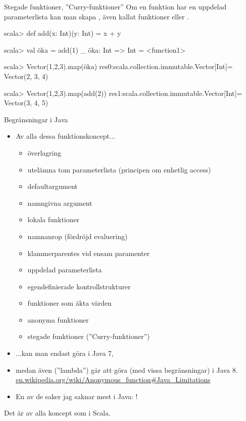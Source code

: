 \begin{Slide}{Stegade funktioner, ''Curry-funktioner''}
Om en funktion har en uppdelad parameterlista kan man skapa , även kallat  funktioner  eller .
\begin{REPLnonum}
scala> def add(x: Int)(y: Int) = x + y  

scala> val öka = add(1) _
öka: Int => Int = <function1>

scala> Vector(1,2,3).map(öka)
res0:scala.collection.immutable.Vector[Int]= Vector(2, 3, 4)

scala> Vector(1,2,3).map(add(2))
res1:scala.collection.immutable.Vector[Int]= Vector(3, 4, 5)
\end{REPLnonum}
\end{Slide} 


\begin{Slide}{Begränsningar i Java}\SlideFontTiny
\begin{itemize}
\item Av alla dessa funktionskoncept...
\begin{itemize}\SlideFontTiny
\item överlagring
\item utelämna tom parameterlista (principen om enhetlig access)
\item defaultargument
\item namngivna argument
\item lokala funktioner
\item namnanrop (fördröjd evaluering)
\item klammerparentes vid ensam paramenter
\item uppdelad parameterlista
\item egendefinierade kontrollstrukturer
\item funktioner som äkta värden
\item anonyma funktioner
\item stegade funktioner (''Curry-funktioner'')
\end{itemize}
\item ...kan man endast göra  i Java 7, 
\item medan även  (''lambda'') går att göra (med vissa begränsningar) i Java 8. \href{https://en.wikipedia.org/wiki/Anonymous_function\#Java_Limitations}{en.wikipedia.org/wiki/Anonymous\_function\#Java\_Limitations}
\item \vspace{0.5em} En av de saker jag saknar mest i Java: !
\end{itemize}
Det är  av alla koncept som  i Scala.

\end{Slide} 



